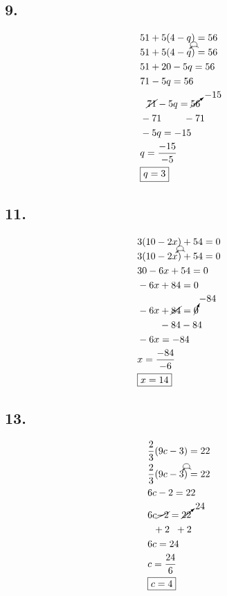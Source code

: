 \documentclass{article}
\newcommand{\tikzmark}[1]{\tikz[overlay,remember picture] \node (#1) {};}
\newcommand{\DrawBox}[2]{%
    \begin{tikzpicture}[overlay,remember picture]
        \draw[->,shorten >=5pt,shorten <=5pt,out=70,in=130,distance=0.5cm,#1] (MarkA.north) to (MarkC.north);
        \draw[->,shorten >=5pt,shorten <=5pt,out=50,in=140,distance=0.3cm,#2] (MarkA.north) to (MarkB.north);
    \end{tikzpicture}
}
\begin{document}
    \subsection*{9.}
    \begin{align*}
        & 51 + 5(4 - q) = 56 \\
        & 51 + \tikzmark{MarkA}5 (4\tikzmark{MarkB} - q\tikzmark{MarkC})\DrawBox{black}{black} = 56 \\
        & 51 + 20 -5q = 56 \\
        & 71 -5q = 56 \\
        & \hspace{.25cm}\cancel{71} - 5q = \cancelto{-15}{56} \\
        & - 71 \hspace{.8cm} - 71 \\
        & -5q = -15\\
        & q = \frac{-15}{-5} \\
        & \boxed{q = 3}
    \end{align*}

    \subsection*{11.}
    \begin{align*}
        & 3(10 -2x) + 54 = 0 \\
        & \tikzmark{MarkA}3 (10\tikzmark{MarkB} - 2x\tikzmark{MarkC})\DrawBox{black}{black} + 54 = 0 \\
        & 30 - 6x + 54 = 0 \\
        & - 6x + 84 = 0 \\
        & -6x + \cancel{84} = \cancelto{-84}{0} \\
        & \hspace{.8cm} -84 -84 \\
        & -6x = -84 \\
        & x = \frac{-84}{-6} \\
        & \boxed{x = 14}
    \end{align*}

    \subsection*{13.}
    \begin{align*}
        & \frac{2}{3}(9c - 3) = 22 \\
        & \tikzmark{MarkA}\frac{2}{3} (9c\tikzmark{MarkB} - 3\tikzmark{MarkC})\DrawBox{black}{black} = 22 \\
        & 6c - 2 = 22 \\
        & 6c \cancel{- 2} = \cancelto{24}{22} \\
        & \hspace{.2cm}+ 2\hspace{.2cm}+ 2 \\
        & 6c = 24 \\
        & c = \frac{24}{6} \\
        & \boxed{c = 4}
    \end{align*}
\end{document}
